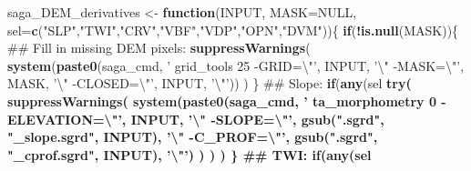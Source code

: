 \documentclass[11pt]{krantz}
\newenvironment{Shaded}{\begin{snugshade}}{\end{snugshade}}
\newcommand{\CharTok}[1]{\textcolor[rgb]{0.5,0.5,0.5}{#1}}
\newcommand{\ControlFlowTok}[1]{\textcolor[rgb]{0.27,0.27,0.27}{\textbf{#1}}}
\newcommand{\DataTypeTok}[1]{\textcolor[rgb]{0.27,0.27,0.27}{#1}}
\newcommand{\KeywordTok}[1]{\textcolor[rgb]{0.27,0.27,0.27}{\textbf{#1}}}
\newcommand{\NormalTok}[1]{#1}
\newcommand{\OperatorTok}[1]{\textcolor[rgb]{0.43,0.43,0.43}{\textbf{#1}}}
\newcommand{\OtherTok}[1]{\textcolor[rgb]{0.37,0.37,0.37}{#1}}
\newcommand{\StringTok}[1]{\textcolor[rgb]{0.5,0.5,0.5}{#1}}
\theoremstyle{definition}
\theoremstyle{definition}
\theoremstyle{definition}
\theoremstyle{remark}
\begin{document}
\begin{Shaded}
\begin{Highlighting}[]
\NormalTok{saga_DEM_derivatives <-}\StringTok{ }\ControlFlowTok{function}\NormalTok{(INPUT, }\DataTypeTok{MASK=}\OtherTok{NULL}\NormalTok{, }\DataTypeTok{sel=}\KeywordTok{c}\NormalTok{(}\StringTok{"SLP"}\NormalTok{,}\StringTok{"TWI"}\NormalTok{,}\StringTok{"CRV"}\NormalTok{,}\StringTok{"VBF"}\NormalTok{,}\StringTok{"VDP"}\NormalTok{,}\StringTok{"OPN"}\NormalTok{,}\StringTok{"DVM"}\NormalTok{))\{}
  \ControlFlowTok{if}\NormalTok{(}\OperatorTok{!}\KeywordTok{is.null}\NormalTok{(MASK))\{}
\NormalTok{    ## Fill in missing DEM pixels:}
    \KeywordTok{suppressWarnings}\NormalTok{( }\KeywordTok{system}\NormalTok{(}\KeywordTok{paste0}\NormalTok{(saga_cmd, }
                                    \StringTok{' grid_tools 25 -GRID=}\CharTok{\textbackslash{}"}\StringTok{'}\NormalTok{, INPUT, }
                                    \StringTok{'}\CharTok{\textbackslash{}"}\StringTok{ -MASK=}\CharTok{\textbackslash{}"}\StringTok{'}\NormalTok{, MASK, }\StringTok{'}\CharTok{\textbackslash{}"}\StringTok{ -CLOSED=}\CharTok{\textbackslash{}"}\StringTok{'}\NormalTok{, }
\NormalTok{                                    INPUT, }\StringTok{'}\CharTok{\textbackslash{}"}\StringTok{'}\NormalTok{)) )}
\NormalTok{  \}}
\NormalTok{  ## Slope:}
  \ControlFlowTok{if}\NormalTok{(}\KeywordTok{any}\NormalTok{(sel }\OperatorTok{%
    \KeywordTok{try}\NormalTok{( }\KeywordTok{suppressWarnings}\NormalTok{( }\KeywordTok{system}\NormalTok{(}\KeywordTok{paste0}\NormalTok{(saga_cmd, }
                                         \StringTok{' ta_morphometry 0 -ELEVATION=}\CharTok{\textbackslash{}"}\StringTok{'}\NormalTok{, }
\NormalTok{                                         INPUT, }\StringTok{'}\CharTok{\textbackslash{}"}\StringTok{ -SLOPE=}\CharTok{\textbackslash{}"}\StringTok{'}\NormalTok{, }
                                         \KeywordTok{gsub}\NormalTok{(}\StringTok{".sgrd"}\NormalTok{, }\StringTok{"_slope.sgrd"}\NormalTok{, INPUT), }
                                         \StringTok{'}\CharTok{\textbackslash{}"}\StringTok{ -C_PROF=}\CharTok{\textbackslash{}"}\StringTok{'}\NormalTok{, }
                                         \KeywordTok{gsub}\NormalTok{(}\StringTok{".sgrd"}\NormalTok{, }\StringTok{"_cprof.sgrd"}\NormalTok{, INPUT), }\StringTok{'}\CharTok{\textbackslash{}"}\StringTok{'}\NormalTok{) ) ) )}
\NormalTok{  \}}
\NormalTok{  ## TWI:}
  \ControlFlowTok{if}\NormalTok{(}\KeywordTok{any}\NormalTok{(sel }\OperatorTok{%
}}
\end{Highlighting}
\end{Shaded}
\end{document}
